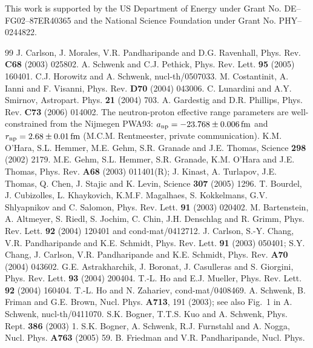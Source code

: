 \documentclass[aps,prc,twocolumn,showpacs,showkeys,amsmath,amssymb]{revtex4}
\newcommand{\fm}{\, \text{fm}}
\begin{document}
This work is supported by the US Department of Energy
under Grant No. DE--FG02--87ER40365 and the National Science Foundation
under Grant No. PHY--0244822.

\begin{thebibliography}{99}
  J. Carlson, J. Morales, V.R. Pandharipande and 
D.G. Ravenhall, Phys. Rev. \textbf{C68} (2003) 025802.
 A. Schwenk and C.J. Pethick, Phys. Rev. Lett. 
\textbf{95} (2005) 160401.
 C.J. Horowitz and A. Schwenk, nucl-th/0507033.
 M. Costantinit, A. Ianni and F. Visanni,
Phys. Rev. \textbf{D70} (2004) 043006.
 C. Lunardini and A.Y.
Smirnov, Astropart. Phys. \textbf{21} (2004) 703.
 A. Gardestig and D.R. Phillips, Phys. Rev.
\textbf{C73} (2006) 014002.
 The
neutron-proton effective range parameters are well-constrained
from the Nijmegen PWA93: $a_{\rm np} = - 23.768 \pm 0.006 \fm$ 
and $r_{\rm np} = 2.68 \pm 0.01 \fm$ (M.C.M. Rentmeester, 
private communication).
 K.M. O'Hara, S.L. Hemmer, M.E. Gehm, S.R. Granade
and J.E. Thomas, Science \textbf{298} (2002) 2179.
 M.E. Gehm, S.L. Hemmer, S.R. Granade, K.M. O'Hara
and J.E. Thomas, Phys. Rev. \textbf{A68} (2003) 011401(R); J. Kinast,
A. Turlapov, J.E. Thomas, Q. Chen, J. Stajic and K. Levin, Science
\textbf{307} (2005) 1296.
 T. Bourdel, J. Cubizolles, L. Khaykovich, K.M.F.
Magalhaes, S. Kokkelmans, G.V. Shlyapnikov and C. Salomon, Phys.
Rev. Lett. \textbf{91} (2003) 020402.
 M. Bartenstein, A. Altmeyer, S. Riedl, S. Jochim,
C. Chin, J.H. Denschlag and R. Grimm, Phys. Rev. Lett. \textbf{92} (2004) 
120401 and cond-mat/0412712.
 J. Carlson, S.-Y. Chang, V.R. Pandharipande and
K.E. Schmidt, Phys. Rev. Lett. \textbf{91} (2003) 050401;
S.Y. Chang, J. Carlson, V.R. Pandharipande and K.E. Schmidt,
Phys. Rev. \textbf{A70} (2004) 043602.
 G.E. Astrakharchik, J. Boronat, J. Casulleras and
S. Giorgini, Phys. Rev. Lett. \textbf{93} (2004) 200404.
 T.-L. Ho and E.J. Mueller, Phys. Rev. Lett. \textbf{92}
(2004) 160404.
 T.-L. Ho and N. Zahariev, cond-mat/0408469.
 A. Schwenk, B. Friman and G.E. Brown, Nucl. Phys.
\textbf{A713}, 191 (2003); see also Fig.~1 in
A. Schwenk, nucl-th/0411070.
 S.K. Bogner, T.T.S. Kuo and A. Schwenk, Phys. Rept.
\textbf{386} (2003) 1. 
 S.K. Bogner, A. Schwenk, R.J. Furnstahl and
A. Nogga, Nucl. Phys. \textbf{A763} (2005) 59.
 B. Friedman and V.R. Pandharipande, Nucl. Phys.

\end{thebibliography}
\end{document}
